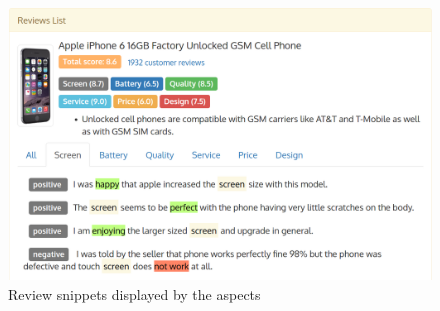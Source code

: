 \documentclass[10pt,final,conference,letterpaper]{IEEEtran}
\begin{document}
\begin{figure}[th]
\includegraphics[width=\columnwidth]{figures/demo21.png}
\caption{Review snippets displayed by the aspects}
\label{fig:summary2}
\end{figure}


 


\end{document}
